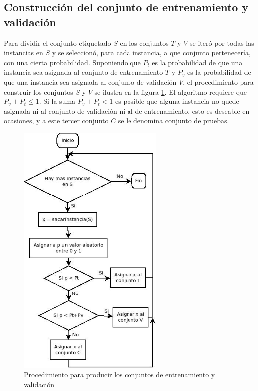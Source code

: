 \documentclass[a4paper, 11pt, oneside]{report}
\begin{document}
\subsection{Construcción del conjunto de entrenamiento y validación}
\label{sect:trainingSet}
Para dividir el conjunto etiquetado $S$ en los conjuntos $T$ y $V$ se iteró por todas las instancias en $S$ y se seleccionó, para cada instancia, a que conjunto pertenecería, con una cierta probabilidad. Suponiendo que $P_t$ es la probabilidad de que una instancia sea asignada al conjunto de entrenamiento $T$ y $P_v$ es la probabilidad de que una instancia sea asignada al conjunto de validación $V$, el procedimiento para construir los conjuntos $S$ y $V$ se ilustra en la figura \ref{fig:setPartition}.
El algoritmo requiere que $P_v + P_t \le 1$. Si la suma $P_v + P_t < 1$ es posible que alguna instancia no quede asignada ni al conjunto de validación ni al de entrenamiento, esto es deseable en ocasiones, y a este tercer conjunto $C$ se le denomina conjunto de pruebas. %
\begin{figure}[htb]
\begin{center}
\leavevmode
\includegraphics[width=7cm]{diagrams/setPartition.jpg}
\end{center}
\caption{Procedimiento para producir los conjuntos de entrenamiento y validación}
\label{fig:setPartition}
\end{figure}
\end{document}
